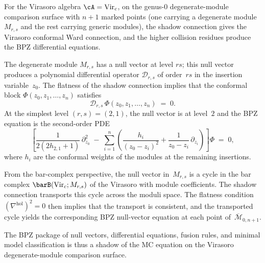 For the Virasoro algebra $\cA = \mathrm{Vir}_c$, on the genus-$0$
degenerate-module comparison surface with $n + 1$ marked points
(one carrying a degenerate module $M_{r,s}$ and the rest carrying
generic modules), the shadow connection gives the Virasoro conformal
Ward connection, and the higher collision residues produce the BPZ
differential equations.

The degenerate module $M_{r,s}$ has a null vector at level $rs$; this
null vector produces a polynomial differential operator
$\mathcal{D}_{r,s}$ of order~$rs$ in the insertion variable~$z_0$.
The flatness of the shadow connection implies that the conformal block
$\Phi(z_0, z_1, \ldots, z_n)$ satisfies
\begin{equation}\label{eq:thqg-intro-bpz-equation}
\mathcal{D}_{r,s}\,\Phi(z_0, z_1, \ldots, z_n)
\;=\; 0.
\end{equation}
At the simplest level $(r,s) = (2,1)$, the null vector is at level~$2$
and the BPZ equation is the second-order PDE
\begin{equation}\label{eq:thqg-intro-bpz-21}
\left[
 \frac{1}{2(2h_{2,1} + 1)}\,\partial_{z_0}^2
 \;-\;
 \sum_{i=1}^n \left(
 \frac{h_i}{(z_0 - z_i)^2}
 + \frac{1}{z_0 - z_i}\,\partial_{z_i}
 \right)
\right]\Phi
\;=\; 0,
\end{equation}
where $h_i$ are the conformal weights of the modules at the
remaining insertions.

From the bar-complex perspective, the null vector in~$M_{r,s}$ is a
cycle in the bar complex
$\barB(\mathrm{Vir}_c; M_{r,s})$ of the Virasoro with module
coefficients. The shadow connection transports this cycle across the
moduli space. The flatness condition
$(\nabla^{\mathrm{hol}})^2 = 0$ then implies that the transport is
consistent, and the transported cycle yields the corresponding BPZ
null-vector equation at each
point of~$\overline{\mathcal{M}}_{0,n+1}$.

The BPZ package of null vectors, differential equations, fusion
rules, and minimal model classification is thus a shadow of the MC
equation on the Virasoro degenerate-module comparison surface.

